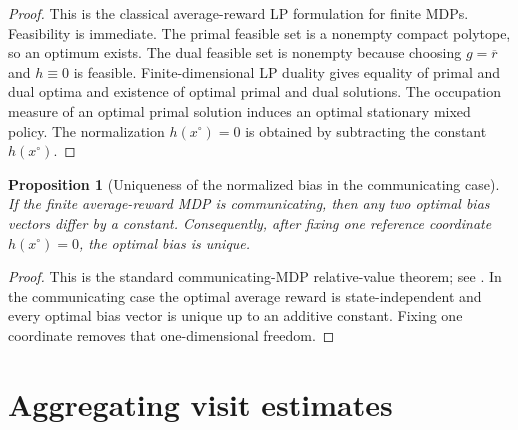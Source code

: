 \documentclass[12pt]{article}
\newtheorem{proposition}[theorem]{Proposition}
\theoremstyle{definition}
\newcommand{\1}{\mathbf{1}}
\begin{document}
\begin{proof}
This is the classical average-reward LP formulation for finite MDPs. Feasibility is
immediate. The primal feasible set is a nonempty compact polytope, so an optimum
exists. The dual feasible set is nonempty because choosing $g=\overline r$ and
$h\equiv 0$ is feasible. Finite-dimensional LP duality gives equality of primal
and dual
optima and existence of optimal primal and dual solutions. The occupation measure
of an optimal primal solution induces an optimal stationary mixed policy. The
normalization $h(x^\circ)=0$ is obtained by subtracting the constant $h(x^\circ)$.
\end{proof}

\begin{proposition}[Uniqueness of the normalized bias in the communicating case]
\label{prop:bias-unique}
If the finite average-reward MDP is communicating, then any two optimal bias
vectors differ by a constant. Consequently, after fixing one reference coordinate
$h(x^\circ)=0$, the optimal bias is unique.
\end{proposition}

\begin{proof}
This is the standard communicating-MDP relative-value theorem; see
\cite[Chapter~8]{Puterman1994}. In the communicating case the optimal average
reward is state-independent and every optimal bias vector is unique up to an
additive constant. Fixing one coordinate removes that one-dimensional freedom.
\end{proof}



\section{Aggregating visit estimates}
\label{app:aggregation}
\end{document}
